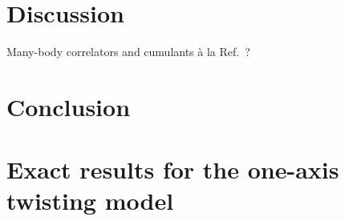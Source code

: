 \documentclass[aps,11pt,notitlepage,nofootinbib,longbibliography]{revtex4-1}
\newcommand{\1}{\mathds{1}}
\begin{document}
\section{Discussion}

Many-body correlators and cumulants \`a la
Ref.~\cite{schweigler2017solving}?


\section{Conclusion}





\newpage
\appendix

\section{Exact results for the one-axis twisting model}
\label{sec:OAT}
\end{document}
